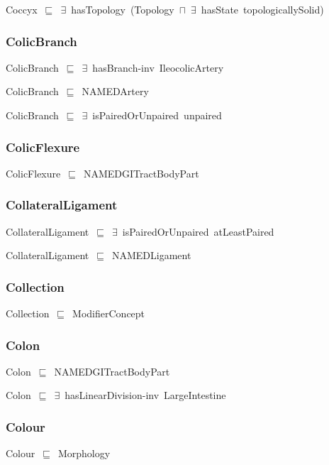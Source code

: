 \documentclass{article}
\begin{document}
Coccyx~\ensuremath{\sqsubseteq}~\ensuremath{\exists}~hasTopology~(Topology~\ensuremath{\sqcap}~\ensuremath{\exists}~hasState~topologicallySolid)~

\subsubsection*{ColicBranch}

ColicBranch~\ensuremath{\sqsubseteq}~\ensuremath{\exists}~hasBranch-inv~IleocolicArtery~

ColicBranch~\ensuremath{\sqsubseteq}~NAMEDArtery~

ColicBranch~\ensuremath{\sqsubseteq}~\ensuremath{\exists}~isPairedOrUnpaired~unpaired~

\subsubsection*{ColicFlexure}

ColicFlexure~\ensuremath{\sqsubseteq}~NAMEDGITractBodyPart~

\subsubsection*{CollateralLigament}

CollateralLigament~\ensuremath{\sqsubseteq}~\ensuremath{\exists}~isPairedOrUnpaired~atLeastPaired~

CollateralLigament~\ensuremath{\sqsubseteq}~NAMEDLigament~

\subsubsection*{Collection}

Collection~\ensuremath{\sqsubseteq}~ModifierConcept~

\subsubsection*{Colon}

Colon~\ensuremath{\sqsubseteq}~NAMEDGITractBodyPart~

Colon~\ensuremath{\sqsubseteq}~\ensuremath{\exists}~hasLinearDivision-inv~LargeIntestine~

\subsubsection*{Colour}

Colour~\ensuremath{\sqsubseteq}~Morphology~
\end{document}
